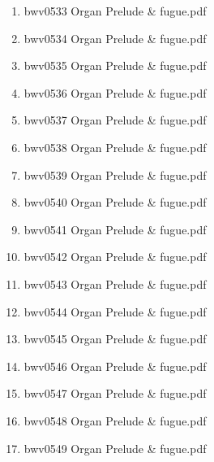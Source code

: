 \documentclass[11pt]{article}
\begin{document}
\begin{enumerate}
\begin{enumerate}
\begin{enumerate}
\begin{enumerate}
\item bwv0533   Organ Prelude \& fugue.pdf
\label{sec-1-1-1-1-44-6-4-1-3-3}

\item bwv0534   Organ Prelude \& fugue.pdf
\label{sec-1-1-1-1-44-6-4-1-3-4}

\item bwv0535   Organ Prelude \& fugue.pdf
\label{sec-1-1-1-1-44-6-4-1-3-5}

\item bwv0536   Organ Prelude \& fugue.pdf
\label{sec-1-1-1-1-44-6-4-1-3-6}

\item bwv0537   Organ Prelude \& fugue.pdf
\label{sec-1-1-1-1-44-6-4-1-3-7}

\item bwv0538   Organ Prelude \& fugue.pdf
\label{sec-1-1-1-1-44-6-4-1-3-8}

\item bwv0539   Organ Prelude \& fugue.pdf
\label{sec-1-1-1-1-44-6-4-1-3-9}

\item bwv0540   Organ Prelude \& fugue.pdf
\label{sec-1-1-1-1-44-6-4-1-3-10}

\item bwv0541   Organ Prelude \& fugue.pdf
\label{sec-1-1-1-1-44-6-4-1-3-11}

\item bwv0542   Organ Prelude \& fugue.pdf
\label{sec-1-1-1-1-44-6-4-1-3-12}

\item bwv0543   Organ Prelude \& fugue.pdf
\label{sec-1-1-1-1-44-6-4-1-3-13}

\item bwv0544   Organ Prelude \& fugue.pdf
\label{sec-1-1-1-1-44-6-4-1-3-14}

\item bwv0545   Organ Prelude \& fugue.pdf
\label{sec-1-1-1-1-44-6-4-1-3-15}

\item bwv0546   Organ Prelude \& fugue.pdf
\label{sec-1-1-1-1-44-6-4-1-3-16}

\item bwv0547   Organ Prelude \& fugue.pdf
\label{sec-1-1-1-1-44-6-4-1-3-17}

\item bwv0548   Organ Prelude \& fugue.pdf
\label{sec-1-1-1-1-44-6-4-1-3-18}

\item bwv0549   Organ Prelude \& fugue.pdf
\label{sec-1-1-1-1-44-6-4-1-3-19}


\end{enumerate}
\end{enumerate}
\end{enumerate}
\end{enumerate}
\end{document}
